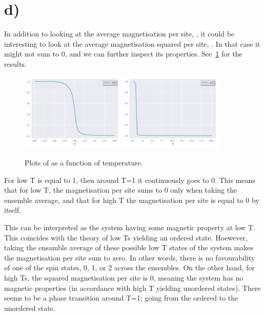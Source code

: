 \section*{d)}
    In addition to looking at the average magnetisation per site, , it could be interesting to look at the average magnetisation squared per site, . In that case it might not sum to 0, and we can further inspect its properties. See~\cref{fig:m2_T} for the results. 
    \begin{figure}
        \centering
        \includegraphics[width=0.44\textwidth]{../figs/m2_T_2.pdf}
        \includegraphics[width=0.44\textwidth]{../figs/m2_T_20.pdf}
        \caption{Plots of  as a function of temperature.}
        \label{fig:m2_T}
    \end{figure}
    For low T  is equal to 1, then around T=1 it continuously goes to 0. This means that for low T, the magnetisation per site sums to 0 only when taking the ensemble average, and that for high T the magnetisation per site is equal to 0 by itself. 
    
    This can be interpreted as the system having some magnetic property at low T. This coincides with the theory of low Ts yielding an ordered state. Hoewever, taking the ensamble average of these possible low T states of the system makes the magnetisation per site sum to zero. In other words, there is no favourability of one of the spin states, 0, 1, or 2 across the ensembles. On the other hand, for high Ts, the squared magnetisation per site is 0, meaning the system has no magnetic properties (in accordance with high T yielding unordered states). There seems to be a phase transition around T=1; going from the ordered to the unordered state. 


